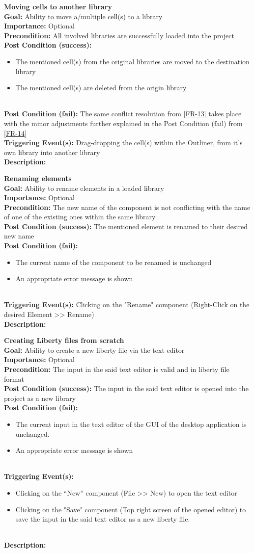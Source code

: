 \documentclass[10pt,a4paper]{report}
\newcommand{\precondition}[1]{
    \textbf{Precondition: } #1 \leavevmode \\
}
\newcommand{\FRODescription}[8]{
    \textbf{#1} \leavevmode \\
    \textbf{Goal: } #2 \leavevmode \\
    \textbf{Importance: } #3 \leavevmode \\
    \precondition{#4}
    \textbf{Post Condition (success): } #5 \leavevmode \\
    \textbf{Post Condition (fail): } #6 \leavevmode \\
    \textbf{Triggering Event(s): } #7 \leavevmode \\
    \textbf{Description: } \leavevmode \\
    #8}
\begin{document}
\begin{FRO}
    \item \FRODescription{Moving cells to another library\label{FRO-1}}
    {Ability to move a/multiple cell(s) to a library}
    {Optional}
    {All involved libraries are successfully loaded into the project}
    {\begin{itemize}
        \item The mentioned cell(s) from the original libraries are moved to the destination library
        \item The mentioned cell(s) are deleted from the origin library
    \end{itemize}}
    {The same conflict resolution from \ref{FR-13} takes place with the minor adjustments further explained in the Post Condition (fail) from \ref{FR-14}}
    {Drag-dropping the cell(s) within the Outliner, from it's own library into another library}
    \item \FRODescription{Renaming elements\label{FRO-2}}
    {Ability to rename elements in a loaded library}
    {Optional}
    {The new name of the component is not conflicting with the name of one of the existing ones within the same library}
    {The mentioned element is renamed to their desired new name}
    {\begin{itemize}
        \item The current name of the component to be renamed is unchanged
        \item An appropriate error message is shown
    \end{itemize}}
    {Clicking on the "Rename" component (Right-Click on the desired Element  >> Rename)}
    \item \FRODescription{Creating Liberty files from scratch\label{FRO-3}}
    {Ability to create a new liberty file via the text editor}
    {Optional}
    {The input in the said text editor is valid and in liberty file format}
    {The input in the said text editor is opened into the project as a new library}
    {\begin{itemize}
        \item The current input in the text editor of the GUI of the desktop application is unchanged.
        \item An appropriate error message is shown
    \end{itemize}}
    {\begin{itemize}
        \item Clicking on the “New” component (File >> New) to open the text editor
        \item Clicking on the "Save" component (Top right screen of the opened editor) to save the input in the said text editor as a new liberty file.

\end{itemize}}
\end{FRO}
\end{document}
